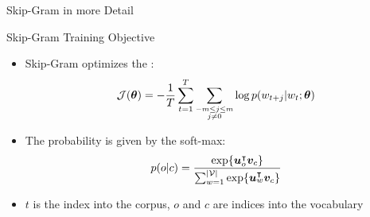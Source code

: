 \begin{frame}{Skip-Gram in more Detail}{}
\end{frame}


\begin{frame}[plain]{}{}
	
\end{frame}


\begin{frame}{Skip-Gram Training Objective}{}
	\begin{itemize}
		\item Skip-Gram optimizes the :
		\begin{equation*}
			\footnotesize
			\mathcal{J}(\bm{\theta}) = -\frac{1}{T} \sum_{t=1}^T \sum_{\substack{-m \le j \le m\\ j \ne 0}}
				\log p(w_{t+j} \vert w_t; \bm{\theta})
		\end{equation*}
		\item The probability is given by the soft-max:
		\begin{equation*}
			\footnotesize
			p(o \vert c) = \frac{\exp\{ \bm{u}_o^{\intercal} \bm{v}_c \}}{
				\sum_{w=1}^{\vert \mathcal{V} \vert} \exp\{ \bm{u}_w^{\intercal} \bm{v}_c \}}
		\end{equation*}
		\item $t$ is the index into the corpus, $o$ and $c$ are indices into the vocabulary
	\end{itemize}
\end{frame}


